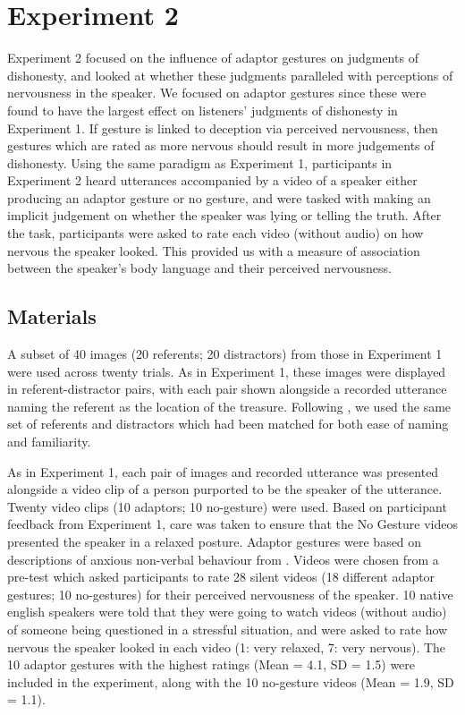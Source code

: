 \documentclass[a4paper,man,natbib]{apa6}
\begin{document}
\section{Experiment 2}
Experiment 2 focused on the influence of adaptor gestures on judgments of dishonesty, and looked at whether these judgments paralleled with perceptions of nervousness in the speaker.
We focused on adaptor gestures since these were found to have the largest effect on listeners' judgments of dishonesty in Experiment 1. 
If gesture is linked to deception via perceived nervousness, then gestures which are rated as more nervous should result in more judgements of dishonesty. 
Using the same paradigm as Experiment 1, participants in Experiment 2 heard utterances accompanied by a video of a speaker either producing an adaptor gesture or no gesture, and were tasked with making an implicit judgement on whether the speaker was lying or telling the truth. 
After the task, participants were asked to rate each video (without audio) on how nervous the speaker looked.
This provided us with a measure of association between the speaker's body language and their perceived nervousness.

\subsection{Materials}
A subset of 40 images (20 referents; 20 distractors) from those in Experiment 1 were used across twenty trials.
As in Experiment 1, these images were displayed in referent-distractor pairs, with each pair shown alongside a recorded utterance naming the referent as the location of the treasure.
Following \citet{Loy2017}, we used the same set of referents and distractors which had been matched for both ease of naming and familiarity.

As in Experiment 1, each pair of images and recorded utterance was presented alongside a video clip of a person purported to be the speaker of the utterance.
Twenty video clips (10 adaptors; 10 no-gesture) were used. 
Based on participant feedback from Experiment 1, care was taken to ensure that the No Gesture videos presented the speaker in a relaxed posture. 
Adaptor gestures were based on descriptions of anxious non-verbal behaviour from \citet{Gregersen2005}.
Videos were chosen from a pre-test which asked participants to rate 28 silent videos (18 different adaptor gestures; 10 no-gestures) for their perceived nervousness of the speaker. 
10 native english speakers were told that they were going to watch videos (without audio) of someone being questioned in a stressful situation, and were asked to rate how nervous the speaker looked in each video (1: very relaxed, 7: very nervous). 
The 10 adaptor gestures with the highest ratings (Mean = 4.1, SD = 1.5) were included in the experiment, along with the 10 no-gesture videos (Mean = 1.9, SD = 1.1).
\end{document}
